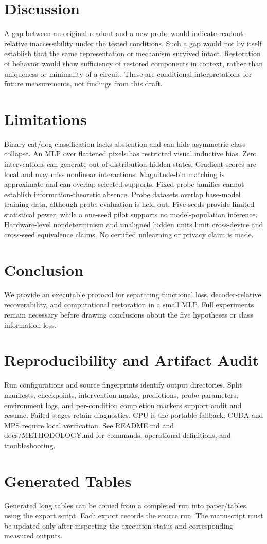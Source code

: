 \documentclass[11pt]{article}
\begin{document}
\section{Discussion}
A gap between an original readout and a new probe would indicate readout-relative inaccessibility under the tested conditions. Such a gap would not by itself establish that the same representation or mechanism survived intact. Restoration of behavior would show sufficiency of restored components in context, rather than uniqueness or minimality of a circuit. These are conditional interpretations for future measurements, not findings from this draft.
\section{Limitations}
Binary cat/dog classification lacks abstention and can hide asymmetric class collapse. An MLP over flattened pixels has restricted visual inductive bias. Zero interventions can generate out-of-distribution hidden states. Gradient scores are local and may miss nonlinear interactions. Magnitude-bin matching is approximate and can overlap selected supports. Fixed probe families cannot establish information-theoretic absence. Probe datasets overlap base-model training data, although probe evaluation is held out. Five seeds provide limited statistical power, while a one-seed pilot supports no model-population inference. Hardware-level nondeterminism and unaligned hidden units limit cross-device and cross-seed equivalence claims. No certified unlearning or privacy claim is made.
\section{Conclusion}
We provide an executable protocol for separating functional loss, decoder-relative recoverability, and computational restoration in a small MLP. Full experiments remain necessary before drawing conclusions about the five hypotheses or class information loss.

\appendix
\section{Reproducibility and Artifact Audit}
Run configurations and source fingerprints identify output directories. Split manifests, checkpoints, intervention masks, predictions, probe parameters, environment logs, and per-condition completion markers support audit and resume. Failed stages retain diagnostics. CPU is the portable fallback; CUDA and MPS require local verification. See README.md and docs/METHODOLOGY.md for commands, operational definitions, and troubleshooting.
\section{Generated Tables}
Generated long tables can be copied from a completed run into paper/tables using the export script. Each export records the source run. The manuscript must be updated only after inspecting the execution status and corresponding measured outputs.
\end{document}
